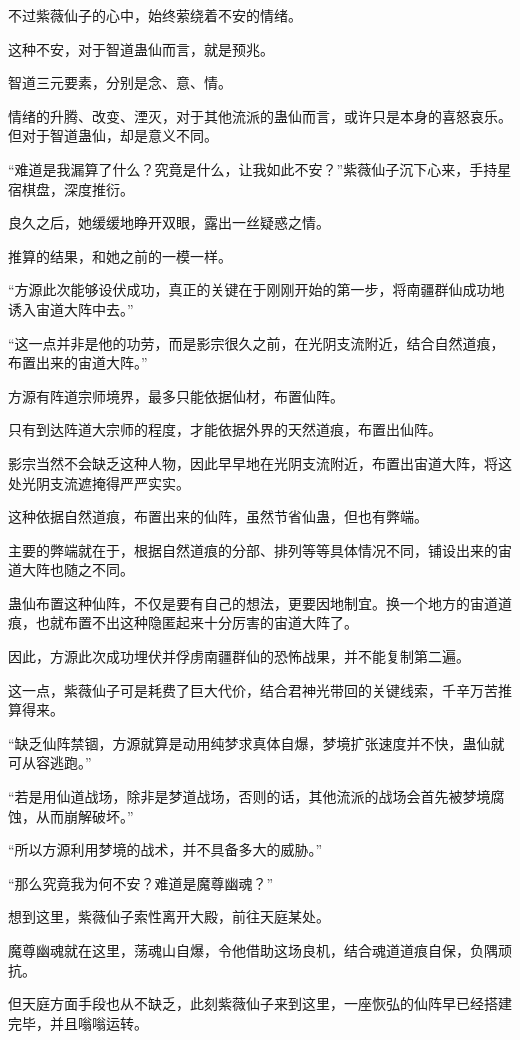 \begin{this_body}
不过紫薇仙子的心中，始终萦绕着不安的情绪。

这种不安，对于智道蛊仙而言，就是预兆。

智道三元要素，分别是念、意、情。

情绪的升腾、改变、湮灭，对于其他流派的蛊仙而言，或许只是本身的喜怒哀乐。但对于智道蛊仙，却是意义不同。

“难道是我漏算了什么？究竟是什么，让我如此不安？”紫薇仙子沉下心来，手持星宿棋盘，深度推衍。

良久之后，她缓缓地睁开双眼，露出一丝疑惑之情。

推算的结果，和她之前的一模一样。

“方源此次能够设伏成功，真正的关键在于刚刚开始的第一步，将南疆群仙成功地诱入宙道大阵中去。”

“这一点并非是他的功劳，而是影宗很久之前，在光阴支流附近，结合自然道痕，布置出来的宙道大阵。”

方源有阵道宗师境界，最多只能依据仙材，布置仙阵。

只有到达阵道大宗师的程度，才能依据外界的天然道痕，布置出仙阵。

影宗当然不会缺乏这种人物，因此早早地在光阴支流附近，布置出宙道大阵，将这处光阴支流遮掩得严严实实。

这种依据自然道痕，布置出来的仙阵，虽然节省仙蛊，但也有弊端。

主要的弊端就在于，根据自然道痕的分部、排列等等具体情况不同，铺设出来的宙道大阵也随之不同。

蛊仙布置这种仙阵，不仅是要有自己的想法，更要因地制宜。换一个地方的宙道道痕，也就布置不出这种隐匿起来十分厉害的宙道大阵了。

因此，方源此次成功埋伏并俘虏南疆群仙的恐怖战果，并不能复制第二遍。

这一点，紫薇仙子可是耗费了巨大代价，结合君神光带回的关键线索，千辛万苦推算得来。

“缺乏仙阵禁锢，方源就算是动用纯梦求真体自爆，梦境扩张速度并不快，蛊仙就可从容逃跑。”

“若是用仙道战场，除非是梦道战场，否则的话，其他流派的战场会首先被梦境腐蚀，从而崩解破坏。”

“所以方源利用梦境的战术，并不具备多大的威胁。”

“那么究竟我为何不安？难道是魔尊幽魂？”

想到这里，紫薇仙子索性离开大殿，前往天庭某处。

魔尊幽魂就在这里，荡魂山自爆，令他借助这场良机，结合魂道道痕自保，负隅顽抗。

但天庭方面手段也从不缺乏，此刻紫薇仙子来到这里，一座恢弘的仙阵早已经搭建完毕，并且嗡嗡运转。


\end{this_body}
